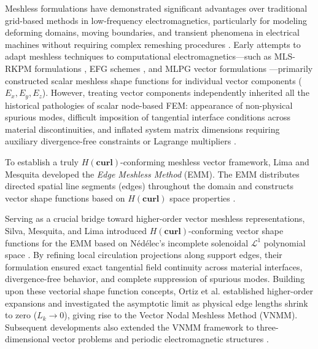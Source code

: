 \documentclass[preprint,12pt]{elsarticle}
\begin{document}
Meshless formulations have demonstrated significant advantages over traditional grid-based methods in low-frequency electromagnetics, particularly for modeling deforming domains, moving boundaries, and transient phenomena in electrical machines without requiring complex remeshing procedures \cite{viana1999moving, parreira2006element, coppoli2012induction}. Early attempts to adapt meshless techniques to computational electromagnetics---such as MLS-RKPM formulations \cite{viana1999moving}, EFG schemes \cite{cingoski1998element, parreira2006element}, and MLPG vector formulations \cite{atluri2002meshless,fonseca2008imposing, nicomedes2012meshless}---primarily constructed scalar meshless shape functions for individual vector components ($E_x, E_y, E_z$). However, treating vector components independently inherited all the historical pathologies of scalar node-based FEM: appearance of non-physical spurious modes, difficult imposition of tangential interface conditions across material discontinuities, and inflated system matrix dimensions requiring auxiliary divergence-free constraints or Lagrange multipliers \cite{nicomedes2015mixed, lima2016metodos, ortiz2023tese}.

To establish a truly $H(\mathbf{curl})$-conforming meshless vector framework, Lima and Mesquita \cite{lima2017edge} developed the \emph{Edge Meshless Method} (EMM). The EMM distributes directed spatial line segments (edges) throughout the domain and constructs vector shape functions based on $H(\mathbf{curl})$ space properties \cite{lima2017edge, lima2016metodos}.

Serving as a crucial bridge toward higher-order vector meshless representations, Silva, Mesquita, and Lima \cite{silva2018new} introduced $H(\mathbf{curl})$-conforming vector shape functions for the EMM based on N\'ed\'elec's incomplete solenoidal $\mathcal{L}^1$ polynomial space \cite{nedelec1980mixed}. By refining local circulation projections along support edges, their formulation ensured exact tangential field continuity across material interfaces, divergence-free behavior, and complete suppression of spurious modes. Building upon these vectorial shape function concepts, Ortiz et al. \cite{ortiz2021creating, ortiz2021nodal, ortiz2023tese} established higher-order expansions and investigated the asymptotic limit as physical edge lengths shrink to zero ($L_k \to 0$), giving rise to the Vector Nodal Meshless Method (VNMM). Subsequent developments also extended the VNMM framework to three-dimensional vector problems \cite{goncalves2023vector, goncalves2025tese} and periodic electromagnetic structures \cite{goncalves2026periodic}.
\end{document}
